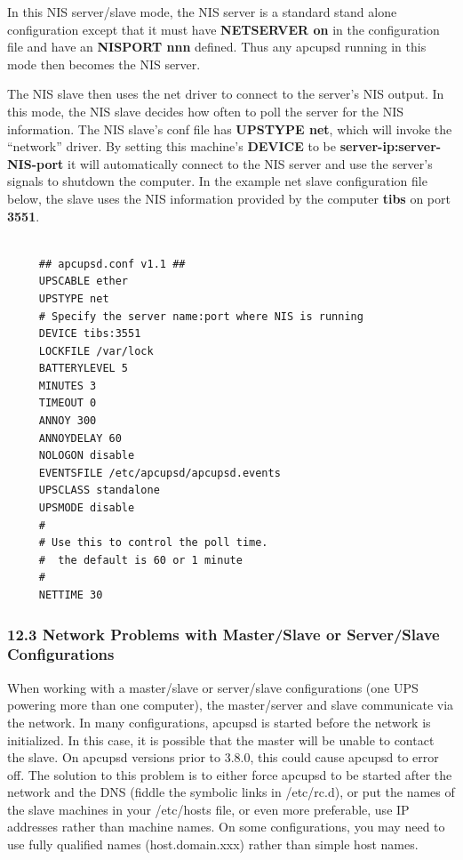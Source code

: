 {{{{{{{{{In this NIS server/slave mode, the NIS server is a standard stand alone
configuration except that it must have {\bf NETSERVER on} in the configuration
file and have an {\bf NISPORT nnn} defined. Thus any apcupsd running in this
mode then becomes the NIS server.  

The NIS slave then uses the net driver to connect to the server's NIS output.
In this mode, the NIS slave decides how often to poll the server for the NIS
information. The NIS slave's conf file has {\bf UPSTYPE net}, which will
invoke the ``network'' driver. By setting this machine's {\bf DEVICE} to be
{\bf server-ip:server-NIS-port} it will automatically connect to the NIS
server and use the server's signals to shutdown the computer.  In the example
net slave configuration file below, the slave uses the NIS information
provided by the computer {\bf tibs} on port {\bf 3551}. 

\footnotesize
\begin{verbatim}
     
     ## apcupsd.conf v1.1 ##
     UPSCABLE ether
     UPSTYPE net
     # Specify the server name:port where NIS is running
     DEVICE tibs:3551
     LOCKFILE /var/lock
     BATTERYLEVEL 5
     MINUTES 3
     TIMEOUT 0
     ANNOY 300
     ANNOYDELAY 60
     NOLOGON disable
     EVENTSFILE /etc/apcupsd/apcupsd.events
     UPSCLASS standalone
     UPSMODE disable
     #
     # Use this to control the poll time.
     #  the default is 60 or 1 minute
     #
     NETTIME 30
\end{verbatim}
\normalsize

\label{Network-Problems-with-Master_002fSlave-or-Server_002fSlave-Configuratio%
ns}

\subsubsection*{12.3 Network Problems with Master/Slave or Server/Slave
Configurations}

\label{index-Problems_002c-Master_002fSlave-159}
\label{index-Problems_002c-networking-160}
When working with a master/slave or server/slave configurations (one UPS
powering more than one computer), the master/server and slave communicate via
the network. In many configurations, apcupsd is started before the network is
initialized. In this case, it is possible that the master will be unable to
contact the slave. On apcupsd versions prior to 3.8.0, this could cause
apcupsd to error off. The solution to this problem is to either force apcupsd
to be started after the network and the DNS (fiddle the symbolic links in
/etc/rc.d), or put the names of the slave machines in your /etc/hosts file, or
even more preferable, use IP addresses rather than machine names. On some
configurations, you may need to use fully qualified names (host.domain.xxx)
rather than simple host names. 

}}}}}}}}}
